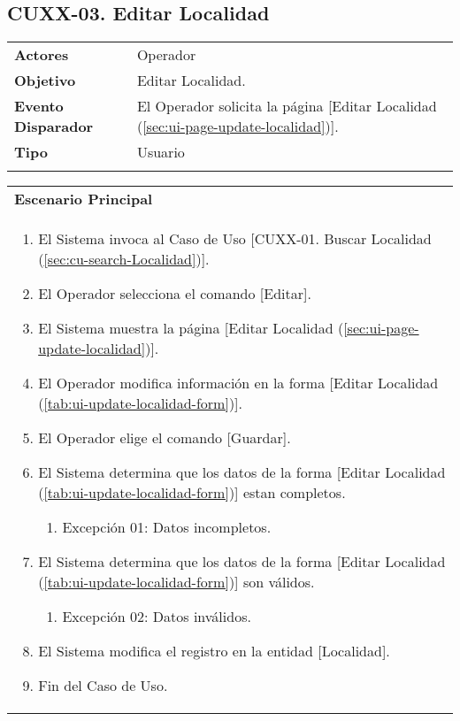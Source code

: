 \clearpage
\subsection{CUXX-03. Editar Localidad} \label{sec:cu-update-Localidad}

\begin{tabular}{ p{3.5cm} p{11.5cm} }
	\textbf{Actores} & Operador\\
	\textbf{Objetivo} & Editar Localidad.\\
	\textbf{Evento Disparador} & El Operador solicita la página [Editar Localidad (\ref{sec:ui-page-update-localidad})].\\
	\textbf{Tipo} & Usuario\\
	\\
\end{tabular}

\begin{tabular}{ p{15.5cm} }
	\textbf{Escenario Principal} \\
	\begin{enumerate}
		\item El Sistema invoca al Caso de Uso [CUXX-01. Buscar Localidad (\ref{sec:cu-search-Localidad})].
		\item El Operador selecciona el comando [Editar].
		\item El Sistema muestra la página [Editar Localidad (\ref{sec:ui-page-update-localidad})].
		\item El Operador modifica información en la forma [Editar Localidad (\ref{tab:ui-update-localidad-form})].
		\item El Operador elige el comando [Guardar].
		\item El Sistema determina que los datos de la forma [Editar Localidad (\ref{tab:ui-update-localidad-form})] estan completos.
			\begin{enumerate}
				\item Excepción 01: Datos incompletos.
			\end{enumerate}
		\item El Sistema determina que los datos de la forma [Editar Localidad (\ref{tab:ui-update-localidad-form})] son válidos.
			\begin{enumerate}
				\item Excepción 02: Datos inválidos.
			\end{enumerate}
		\item El Sistema modifica el registro en la entidad [Localidad].
		\item Fin del Caso de Uso.
	\end{enumerate}
\end{tabular}

